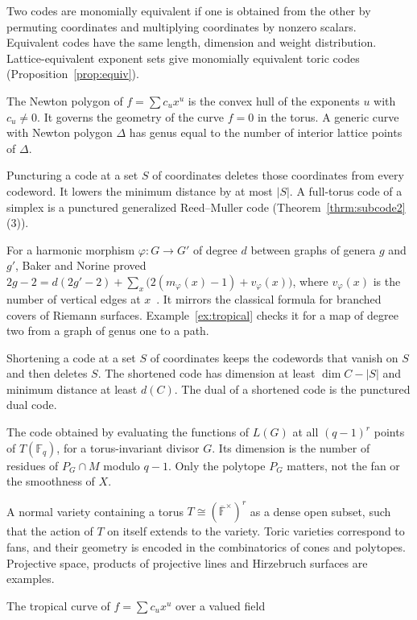 \documentclass[12pt,letterpaper]{article}
\numberwithin{equation}{section}
\theoremstyle{definition}
\theoremstyle{remark}
\newcommand{\F}{\mathbb{F}}
\newcommand{\Fq}{\mathbb{F}_q}
\begin{document}
\begin{description}[leftmargin=1.5em,labelindent=0pt,style=nextline]
\item[Monomial equivalence] Two codes are monomially equivalent if one is
obtained from the other by permuting coordinates and multiplying coordinates
by nonzero scalars. Equivalent codes have the same length, dimension and
weight distribution. Lattice-equivalent exponent sets give monomially
equivalent toric codes (Proposition~\ref{prop:equiv}).
\item[Newton polygon] The Newton polygon of $f=\sum c_ux^u$ is the convex hull
of the exponents $u$ with $c_u\ne0$. It governs the geometry of the curve
$f=0$ in the torus. A generic curve with Newton polygon $\Delta$ has genus
equal to the number of interior lattice points of $\Delta$.
\item[Puncturing] Puncturing a code at a set $S$ of coordinates deletes those
coordinates from every codeword. It lowers the minimum distance by at most
$|S|$. A full-torus code of a simplex is a punctured generalized Reed--Muller
code (Theorem~\ref{thrm:subcode2}(3)).
\item[Riemann--Hurwitz formula] For a harmonic morphism $\varphi:G\to G'$ of
degree $d$ between graphs of genera $g$ and $g'$, Baker and Norine proved
$2g-2=d(2g'-2)+\sum_x\bigl(2(m_\varphi(x)-1)+v_\varphi(x)\bigr)$, where
$v_\varphi(x)$ is the number of vertical edges at $x$~\cite{BN09}. It mirrors
the classical formula for branched covers of Riemann surfaces.
Example~\ref{ex:tropical} checks it for a map of degree two from a graph of
genus one to a path.
\item[Shortening] Shortening a code at a set $S$ of coordinates keeps the
codewords that vanish on $S$ and then deletes $S$. The shortened code has
dimension at least $\dim C-|S|$ and minimum distance at least $d(C)$. The dual
of a shortened code is the punctured dual code.
\item[Standard toric code] The code obtained by evaluating the functions of
$L(G)$ at all $(q-1)^r$ points of $T(\Fq)$, for a torus-invariant divisor $G$.
Its dimension is the number of residues of $P_G\cap M$ modulo $q-1$. Only the
polytope $P_G$ matters, not the fan or the smoothness of $X$.
\item[Toric variety] A normal variety containing a torus
$T\cong(\overline{\F}^\times)^r$ as a dense open subset, such that the action
of $T$ on itself extends to the variety. Toric varieties correspond to fans,
and their geometry is encoded in the combinatorics of cones and polytopes.
Projective space, products of projective lines and Hirzebruch surfaces are
examples.
\item[Tropical curve] The tropical curve of $f=\sum c_ux^u$ over a valued field

\end{description}
\end{document}
